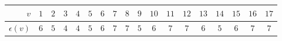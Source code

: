 
\begin{tabular}{r|ccccccccccccccccc}
$v$ & $1$ & $2$ & $3$ & $4$ & $5$ & $6$ & $7$ & $8$ & $9$ & $10$ & $11$ & $12$ & $13$ & $14$ & $15$ & $16$ & $17$ \\\hline
$\epsilon(v)$ & $6$ & $5$ & $4$ & $4$ & $5$ & $6$ & $7$ & $7$ & $5$ & $6$ & $7$ & $7$ & $6$ & $5$ & $6$ & $7$ & $7$
\end{tabular}
